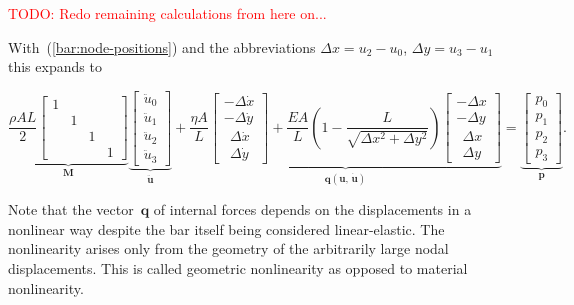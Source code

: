 \textcolor{red}{TODO: Redo remaining calculations from here on...}

With~(\ref{bar:node-positions}) and the abbreviations $\Delta x = u_{2} - u_{0}$, $\Delta y = u_{3} - u_{1}$ this expands to

\begin{equation}
\underbrace{
\frac{\rho A L}{2}
\begin{bmatrix}
1\\
& 1\\
&& 1\\
&&& 1
\end{bmatrix}
}_{\boldsymbol{M}}
\underbrace{
\begin{bmatrix}
\ddot{u}_0\\
\ddot{u}_1\\
\ddot{u}_2\\
\ddot{u}_3
\end{bmatrix}
}_{\boldsymbol{\ddot{u}}}
+
\underbrace{
\frac{\eta A}{L}
\begin{bmatrix}
-\Delta \dot{x}\\
-\Delta \dot{y}\\
\ \ \Delta \dot{x}\\
\ \ \Delta \dot{y}
\end{bmatrix}
+
\frac{EA}{L}\left(1 - \frac{L}{\sqrt{\Delta x^2 + \Delta y^2}}\right)
\begin{bmatrix}
-\Delta x\\
-\Delta y\\
\ \ \Delta x\\
\ \ \Delta y
\end{bmatrix}
}_{\boldsymbol{q}(\boldsymbol{u},\,\dot{\boldsymbol{u}})}
=
\underbrace{
\begin{bmatrix}
p_0\\
p_1\\
p_2\\
p_3
\end{bmatrix}
}_{\boldsymbol{p}}.
\end{equation}

Note that the vector~$\boldsymbol{q}$ of internal forces depends on the displacements in a nonlinear way despite the bar itself being considered linear-elastic. The nonlinearity arises only from the geometry of the arbitrarily large nodal displacements. This is called geometric nonlinearity as opposed to material nonlinearity.

